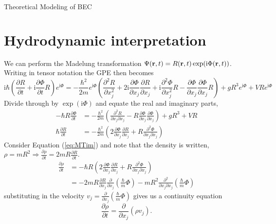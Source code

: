 \begin{chapter}{\label{cha:theoretical_model}Theoretical Modeling of BEC}
\section{\label{section:hydrodynamic} Hydrodynamic interpretation}
	We can perform the Madelung transformation $\Psi({\bf r},t) = R({\bf r},t)\exp (\mathrm{i}\Phi({\bf r},t))$.
	Writing in tensor notation the GPE then becomes
	\begin{equation*}
		\mathrm{i}\hbar\left( \frac{\partial R}{\partial t} + \mathrm{i}\frac{\partial \Phi}{\partial t} R \right)e^{\mathrm{i}\Phi} =
		-\frac{\hbar^2}{2m}e^{\mathrm{i}\Phi}\left( \frac{\partial^2 R}{\partial x_j^2} + 2\mathrm{i}\frac{\partial \Phi}{\partial x_j}\frac{\partial R}{\partial x_j}+
		\mathrm{i}\frac{\partial^2 \Phi}{\partial x_j^2}R -  \frac{\partial \Phi}{\partial x_j}\frac{\partial \Phi}{\partial x_j} R  \right) + gR^3e^{\mathrm{i}\Phi} + VRe^{\mathrm{i}\Phi}
	\end{equation*}
	Divide through by $\exp (\mathrm{i}\Phi)$ and equate the real and imaginary parts,
	\begin{align}
		-\hbar R \frac{\partial \Phi}{\partial t} &= -\frac{\hbar^2}{2m}\left( \frac{\partial^2 R}{\partial x_j \partial x_j} - R \frac{\partial \Phi}{\partial x_j}\frac{\partial \Phi}{\partial x_j}  \right) + gR^3 + VR \label{eq:MTre}\\
		\hbar \frac{\partial R}{\partial t} &= -\frac{\hbar^2}{2m}\left( 2\frac{\partial \Phi}{\partial x_j}\frac{\partial R}{\partial x_j} + R \frac{\partial^2 \Phi}{\partial x_j \partial x_j} \right)
		\label{eq:MTim}
	\end{align}
	Consider Equation (\ref{eq:MTim}) and note that the density is written, $\rho = mR^2 \Rightarrow \frac{\partial \rho}{\partial t} = 2mR\frac{\partial R}{\partial t}$.
	\begin{align*}
		\frac{\partial \rho}{\partial t} &= -\hbar R\left( 2 \frac{\partial \Phi}{\partial x_j} \frac{\partial R}{\partial x_j} + R \frac{\partial^2 \Phi}{\partial x_j\partial x_j} \right)\\
		&= -2mR\frac{\partial R}{\partial x_j}\frac{\partial}{\partial x_j}\left( \frac{\hbar}{m} \Phi \right) - mR^2 \frac{\partial^2}{\partial x_j \partial x_j}\left(\frac{\hbar}{m}\Phi \right)
	\end{align*}
	substituting in the velocity $v_j = \frac{\partial}{\partial x_j}\left( \frac{\hbar}{m} \Phi \right)$ gives us a continuity equation
	\begin{equation*}
		\frac{\partial \rho}{\partial t} = \frac{\partial}{\partial x_j} \left( \rho v_j \right).

\end{equation*}
\end{chapter}
